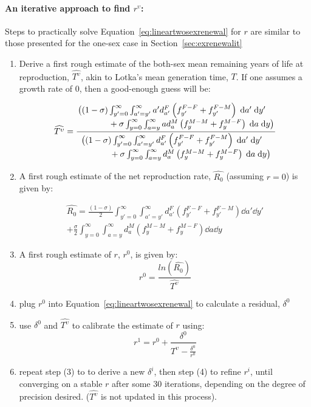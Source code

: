 \paragraph{An iterative approach to find $r^\upsilon$:}
\label{sec:exrenewalit2}
Steps to practically solve Equation~\eqref{eq:lineartwosexrenewal} for $r$ are
similar to those presented for the one-sex case in
Section~\ref{sec:exrenewalit}
\begin{enumerate}
  \item Derive a first rough estimate of the both-sex mean remaining years of
  life at reproduction, $\widehat{T^\upsilon}$, akin to Lotka's mean generation time,
  $T$. If one assumes a growth rate of $0$, then a good-enough guess will be:

\begin{equation}
\widehat{T^\upsilon} = \frac{\splitfrac{
   \big((1 - \sigma)  \int _{y'=0}^\infty \int_{a'=y'}^\infty 
       a' d_{a'}^F \left( f_{y'}^{F-F} + f_{y'}^{F-M} \right) \dd a'\dd y'}{ + 
   \sigma \int_{y=0}^\infty \int _{a=y}^\infty a d_{a}^M  \left( f_{y}^{M-M}+
   f_{y}^{M-F} \right) \dd a \dd y \big)}}{\splitfrac{\big( (1 - \sigma) 
   \int_{y'=0}^\infty \int_{a'=y'}^\infty d_{a'}^F \left( f_{y'}^{F-F} +
   f_{y'}^{F-M} \right) \dd a'\dd y'}{ +\sigma \int _{y=0}^\infty
   \int_{a=y}^\infty d_{a}^M \left( f_{y}^{M-M} + f_{y}^{M-F} \right) \dd a \dd
   y \big)}}
\end{equation}

  \item A first rough estimate of the net reproduction rate, $\widehat{R_0}$ (assuming
  $r=0$) is given by:

 \begin{equation}
 \begin{split}
 \widehat{R_0} = \frac{(1 - \sigma)}{2}  \int _{y'=0}^\infty \int_{a'=y'}^\infty 
                d_{a'}^F \left(f_{y'}^{F-F} + f_{y'}^{F-M}\right) \dd a'\dd y'
                \\ + \frac{\sigma}{2}  \int _{y=0}^\infty \int _{a=y}^\infty 
               d_{a}^M  \left(f_{y}^{M-M}+ f_{y}^{M-F}\right) \dd a \dd y
 \end{split}
 \end{equation}
  \item A first rough estimate of $r$, $r^0$, is given by:
   \begin{equation}
   r^0 = \frac{ln(\widehat{R_0})}{\widehat{T^\upsilon}}
   \end{equation}
  \item plug $r^0$ into Equation~\ref{eq:lineartwosexrenewal} to calculate a
  residual, $\delta^0$
  \item use $\delta^0$ and $\widehat{T^\upsilon}$ to calibrate the estimate of $r$
  using:
  \begin{equation}
  r^{1} = r^0 + \frac{\delta^0}{\widehat{T^\upsilon} - \frac{\delta^0}{r^0}}
  \end{equation}
  \item repeat step (3) to to derive a new $\delta^i$, then step (4) to refine
  $r^i$, until converging on a stable $r$ after some 30 iterations,
  depending on the degree of precision desired. ($\widehat{T^\upsilon}$ is not updated
  in this process).
\end{enumerate}


